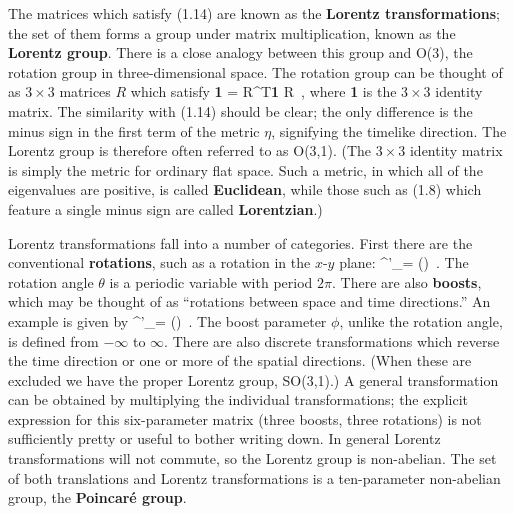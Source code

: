 \documentclass[12pt]{article}
\begin{document}
The matrices which satisfy (1.14) are known as the {\bf Lorentz 
transformations};  the set of them forms a group under matrix multiplication,
known as the {\bf Lorentz group}.  There is a close analogy between this
group and O(3), the rotation group in three-dimensional space.  The
rotation group can be thought of as $3\times 3$ matrices $R$ which satisfy
\be
  {\bf 1} = R^{\rm T}{\bf 1} R\ ,\label{1.16}
\ee
where {\bf 1} is the $3\times 3$ identity matrix.  The similarity with (1.14)
should be clear; the only difference is the minus sign in the first term
of the metric $\eta$, signifying the timelike direction.  The Lorentz
group is therefore often referred to as O(3,1).  (The $3\times 3$ identity
matrix is simply the metric for ordinary flat space.  Such a metric, in
which all of the eigenvalues are positive, is called {\bf Euclidean},
while those such as (1.8) which feature a single minus sign are called
{\bf Lorentzian}.)

Lorentz transformations fall into a number of categories.  First there
are the conventional {\bf rotations}, such as a rotation in the $x$-$y$
plane:
\be
  \Lambda^{\mu'}{}_\nu = \left(\right)\ .\label{1.17}
\ee
The rotation angle $\theta$ is a periodic variable with period $2\pi$.
There are also {\bf boosts}, which may be thought of as ``rotations
between space and time directions.''  An example is given by
\be
  \Lambda^{\mu'}{}_\nu = \left(\right)\ .\label{1.18}
\ee
The boost parameter $\phi$, unlike the rotation angle, is defined 
from $-\infty$ to $\infty$.  There are also discrete transformations 
which reverse the time direction or
one or more of the spatial directions.  (When these are excluded we
have the proper Lorentz group, SO(3,1).)  A general transformation
can be obtained by multiplying the individual transformations; the
explicit expression for this six-parameter matrix (three boosts,
three rotations) is not sufficiently pretty or useful to bother writing
down.  In general Lorentz transformations will not commute, so the 
Lorentz group is non-abelian.  The set of both translations and
Lorentz transformations is a ten-parameter non-abelian group,
the {\bf Poincar\'e group}.
\end{document}

